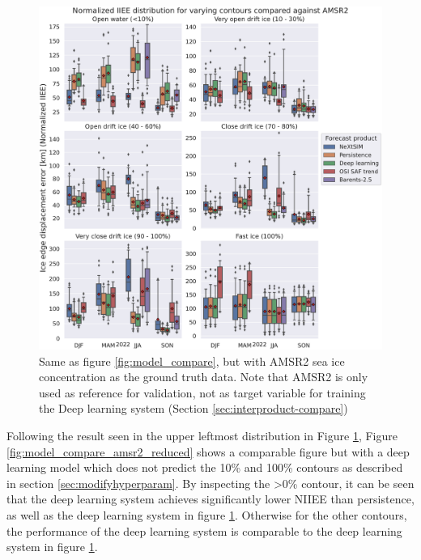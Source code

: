 \documentclass[../main/thesis.tex]{subfiles}
\begin{document}
\begin{figure}
    \centering
    \includegraphics[width=\textwidth]{model_intercomparisson_amsr2.pdf}
    \caption{\label{fig:model_compare_amsr2}Same as figure \ref{fig:model_compare}, but with AMSR2 sea ice concentration as the ground truth data. Note that AMSR2 is only used as reference for validation, not as target variable for training the Deep learning system (Section \ref{sec:interproduct-compare})}
\end{figure}

Following the result seen in the upper leftmost distribution in Figure \ref{fig:model_compare_amsr2}, Figure \ref{fig:model_compare_amsr2_reduced} shows a comparable figure but with a deep learning model which does not predict the 10\% and 100\% contours as described in section \ref{sec:modifyhyperparam}. By inspecting the >0\% contour, it can be seen that the deep learning system achieves significantly lower NIIEE than persistence, as well as the deep learning system in figure \ref{fig:model_compare_amsr2}. Otherwise for the other contours, the performance of the deep learning system is comparable to the deep learning system in figure \ref{fig:model_compare_amsr2}.
\end{document}

